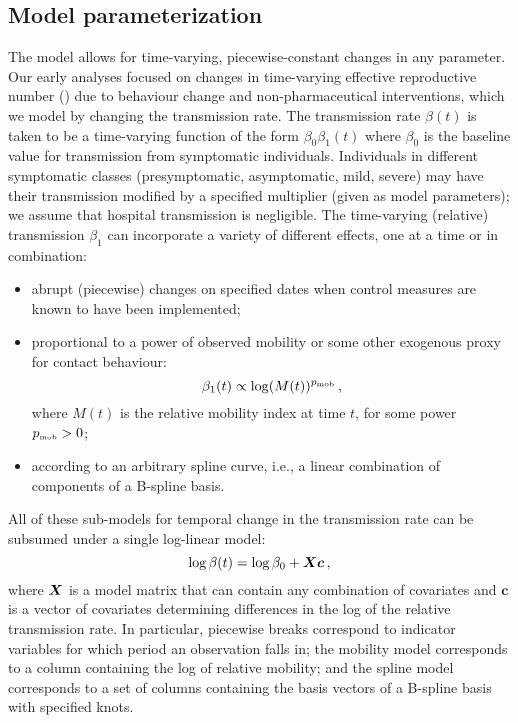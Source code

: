 \documentclass[12pt]{article}\usepackage[]{graphicx}\usepackage[]{color}
\begin{document}
\subsection*{Model parameterization}

The model allows for time-varying, piecewise-constant changes in any parameter. 
Our early analyses focused on changes in time-varying effective reproductive number (\Rt) due to behaviour change and non-pharmaceutical interventions, which we model by changing the transmission rate.
The transmission rate $\beta(t)$ is taken to be a time-varying function of the form $\beta_0 \beta_1(t)$ where $\beta_0$ is the baseline value for transmission from symptomatic individuals.
Individuals in different symptomatic classes (presymptomatic, asymptomatic, mild, severe) may have their transmission modified by a specified multiplier (given as model parameters); we assume that hospital transmission is negligible.
The time-varying (relative) transmission $\beta_1$ can incorporate a variety of different effects, one at a time or in combination:
\begin{itemize}
\item abrupt (piecewise) changes on specified dates when control measures are known to have been implemented;
\item proportional to a power of observed mobility or some other exogenous proxy for contact behaviour:
\begin{equation}
  \beta_1(t) \propto \log(M(t))^{{{p}_{\textrm{\tiny mob}}}} \,, 
\end{equation}
where $M(t)$ is the relative mobility index at time $t$, for some power ${{p}_{\textrm{\tiny mob}}}>0$;
\item according to an arbitrary spline curve, i.e., a linear combination of components of a B-spline basis.
\end{itemize}
All of these sub-models for temporal change in the transmission rate can be subsumed under a single log-linear model:
\begin{equation}\label{eq:betamodel}
\log \beta(t) = \log \beta_0 + \boldsymbol{X}\boldsymbol{c}
\,,
\end{equation}
where $\boldsymbol{X}$ is a model matrix 
that can contain any combination of covariates and $\boldsymbol{c}$ is a vector of covariates determining differences in the log of the relative transmission rate.
In particular, piecewise breaks correspond to indicator variables for which period an observation falls in; the mobility model corresponds to a column containing the log of relative mobility; and the spline model corresponds to a set of columns containing the basis vectors of a B-spline basis with specified knots.
\end{document}
